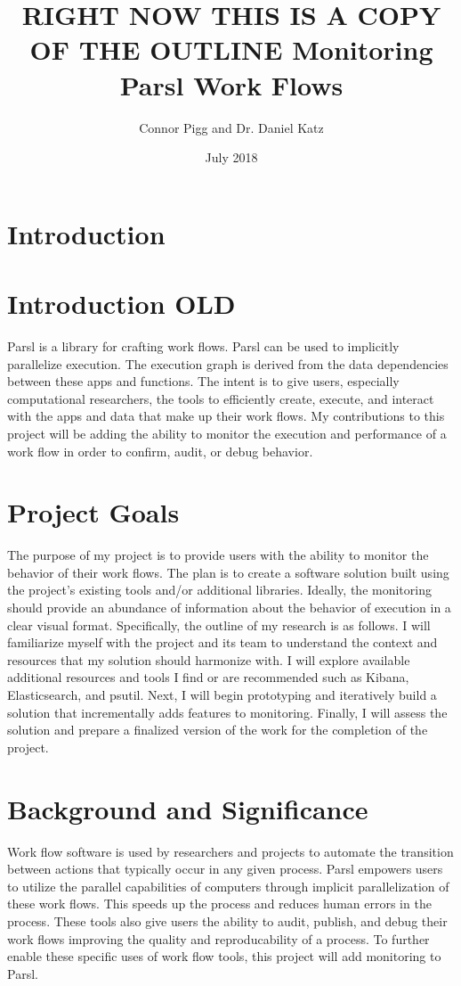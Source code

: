 \documentclass{article}
\title{\textbf{RIGHT NOW THIS IS A COPY OF THE OUTLINE}
Monitoring Parsl Work Flows}
\author{Connor Pigg and Dr. Daniel Katz}
\date{July 2018}
\begin{document}
\maketitle

\section{Introduction}


\section{Introduction OLD}
Parsl is a library for crafting work flows.\citep{babuji_yadu_2017_853492}
Parsl can be used to implicitly parallelize execution.
The execution graph is derived from the data dependencies between these apps and functions.
The intent is to give users, especially computational researchers, the tools to efficiently create, execute, and interact with the apps and data that make up their work flows.
My contributions to this project will be adding the ability to monitor the execution and performance of a work flow in order to confirm, audit, or debug behavior.

\section{Project Goals}
The purpose of my project is to provide users with the ability to monitor the behavior of their work flows.
The plan is to create a software solution built using the project's existing tools and/or additional libraries.
Ideally, the monitoring should provide an abundance of information about the behavior of execution in a clear visual format.
Specifically, the outline of my research is as follows.
I will familiarize myself with the project and its team to understand the context and resources that my solution should harmonize with.
I will explore available additional resources and tools I find or are recommended such as Kibana, Elasticsearch, and psutil.
Next, I will begin prototyping and iteratively build a solution that incrementally adds features to monitoring.
Finally, I will assess the solution and prepare a finalized version of the work for the completion of the project.

\section{Background and Significance}
Work flow software is used by researchers and projects to automate the transition between actions that typically occur in any given process.
Parsl empowers users to utilize the parallel capabilities of computers through implicit parallelization of these work flows.
This speeds up the process and reduces human errors in the process.
These tools also give users the ability to audit, publish, and debug their work flows improving the quality and reproducability of a process.
To further enable these specific uses of work flow tools, this project will add monitoring to Parsl.
\end{document}

